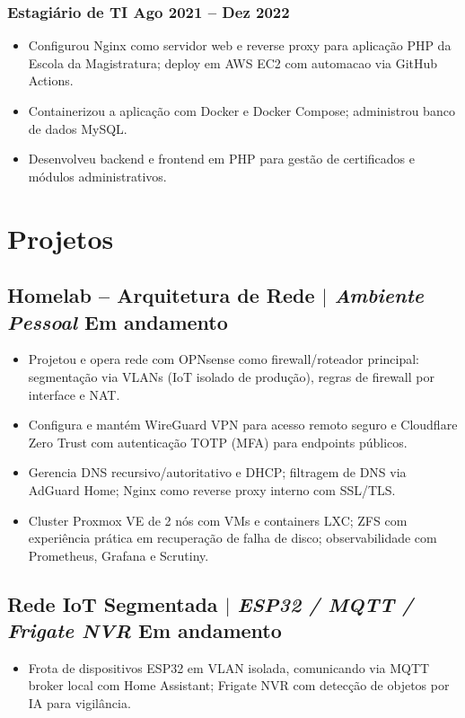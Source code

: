 \documentclass[10.5pt]{article}
\begin{document}
\subsubsection{Estagi\'{a}rio de TI \hfill Ago 2021 -- Dez 2022}
\begin{itemize}
    \item Configurou Nginx como servidor web e reverse proxy para aplica\c{c}\~{a}o PHP da Escola da Magistratura;
          deploy em AWS EC2 com automacao via GitHub Actions.
    \item Containerizou a aplica\c{c}\~{a}o com Docker e Docker Compose; administrou banco de dados MySQL.
    \item Desenvolveu backend e frontend em PHP para gest\~{a}o de certificados e m\'{o}dulos administrativos.
\end{itemize}

\section{Projetos}
\subsection{Homelab -- Arquitetura de Rede $|$ \normalfont\textit{Ambiente Pessoal} \hfill Em andamento}
\begin{itemize}
    \item Projetou e opera rede com OPNsense como firewall/roteador principal: segmenta\c{c}\~{a}o via VLANs
          (IoT isolado de produ\c{c}\~{a}o), regras de firewall por interface e NAT.
    \item Configura e mant\'{e}m WireGuard VPN para acesso remoto seguro e Cloudflare Zero Trust com
          autentica\c{c}\~{a}o TOTP (MFA) para endpoints p\'{u}blicos.
    \item Gerencia DNS recursivo/autoritativo e DHCP; filtragem de DNS via AdGuard Home; Nginx como
          reverse proxy interno com SSL/TLS.
    \item Cluster Proxmox VE de 2 n\'{o}s com VMs e containers LXC; ZFS com experi\^{e}ncia pr\'{a}tica
          em recupera\c{c}\~{a}o de falha de disco; observabilidade com Prometheus, Grafana e Scrutiny.
\end{itemize}
\subsection{Rede IoT Segmentada $|$ \normalfont\textit{ESP32 / MQTT / Frigate NVR} \hfill Em andamento}
\begin{itemize}
    \item Frota de dispositivos ESP32 em VLAN isolada, comunicando via MQTT broker local com Home Assistant;
          Frigate NVR com detec\c{c}\~{a}o de objetos por IA para vigil\^{a}ncia.
\end{itemize}
\end{document}
